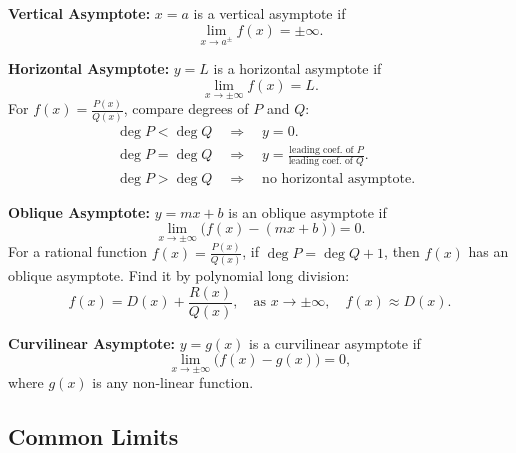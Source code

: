 \documentclass[a4paper,11pt]{article}
\theoremstyle{definition}
\theoremstyle{plain}
\theoremstyle{remark}
\begin{document}
\begin{tcolorbox}[breakable]
    \textbf{Vertical Asymptote:} 
    \( x = a \) is a vertical asymptote if  
    \[
    \lim\limits_{x \to a^{\pm}} f(x) = \pm\infty.
    \]
    
    \textbf{Horizontal Asymptote:}
    \( y = L \) is a horizontal asymptote if  
    \[
    \lim\limits_{x \to \pm\infty} f(x) = L.
    \]
    For \( \displaystyle f(x) = \frac{P(x)}{Q(x)} \), compare degrees of \( P \) and \( Q \):  
    \[
    \begin{aligned}
        &\deg P < \deg Q \quad \Rightarrow \quad y = 0. \\  
        &\deg P = \deg Q \quad \Rightarrow \quad y = \frac{\text{leading coef. of } P}{\text{leading coef. of } Q}. \\  
        &\deg P > \deg Q \quad \Rightarrow \quad \text{no horizontal asymptote}.
    \end{aligned}
    \]

    \textbf{Oblique Asymptote:}
    \( y = mx + b \) is an oblique asymptote if  
    \[
    \lim\limits_{x \to \pm\infty} \big( f(x) - (mx + b) \big) = 0.
    \]
    For a rational function \( \displaystyle f(x) = \frac{P(x)}{Q(x)} \), if \( \deg P = \deg Q + 1 \), then \( f(x) \) has an oblique asymptote.  
    Find it by polynomial long division:  
    \[
    f(x) = D(x) + \frac{R(x)}{Q(x)}, \quad \text{as } x \to \pm\infty, \quad f(x) \approx D(x).
    \]
    
    \newpage
    
    \textbf{Curvilinear Asymptote:}
    \( y = g(x) \) is a curvilinear asymptote if
    \[
    \lim\limits_{x \to \pm\infty} \big( f(x) - g(x) \big) = 0,
    \]
    where \( g(x) \) is any non-linear function.
\end{tcolorbox}




\subsection{Common Limits}
\end{document}
